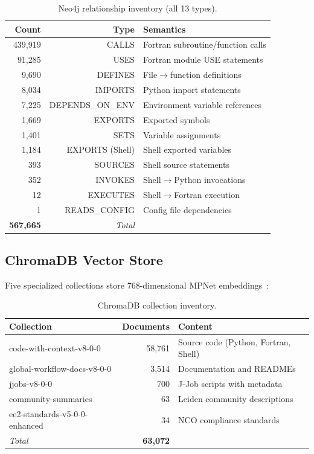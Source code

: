 \documentclass[11pt,letterpaper]{article}
\begin{document}
\begin{table}[H]
\centering
\caption{Neo4j relationship inventory (all 13 types).}
\label{tab:rels}
\begin{tabular}{@{}rrl@{}}
\toprule
\textbf{Count} & \textbf{Type} & \textbf{Semantics} \\
\midrule
439,919 & CALLS         & Fortran subroutine/function calls \\
91,285  & USES          & Fortran module USE statements \\
9,690   & DEFINES       & File$\to$function definitions \\
8,034   & IMPORTS       & Python import statements \\
7,225   & DEPENDS\_ON\_ENV & Environment variable references \\
1,669   & EXPORTS       & Exported symbols \\
1,401   & SETS          & Variable assignments \\
1,184   & EXPORTS (Shell) & Shell exported variables \\
393     & SOURCES       & Shell source statements \\
352     & INVOKES       & Shell$\to$Python invocations \\
12      & EXECUTES      & Shell$\to$Fortran execution \\
1       & READS\_CONFIG & Config file dependencies \\
\midrule
\textbf{567,665} & \textit{Total} & \\
\bottomrule
\end{tabular}
\end{table}

\subsection{ChromaDB Vector Store}

Five specialized collections store 768-dimensional MPNet
embeddings~\cite{song2020mpnet,reimers2019sbert}:

\begin{table}[H]
\centering
\caption{ChromaDB collection inventory.}
\label{tab:collections}
\begin{tabular}{@{}lrl@{}}
\toprule
\textbf{Collection} & \textbf{Documents} & \textbf{Content} \\
\midrule
code-with-context-v8-0-0     & 58,761 & Source code (Python, Fortran, Shell) \\
global-workflow-docs-v8-0-0  & 3,514  & Documentation and READMEs \\
jjobs-v8-0-0                 & 700    & J-Job scripts with metadata \\
community-summaries          & 63     & Leiden community descriptions \\
ee2-standards-v5-0-0-enhanced & 34    & NCO compliance standards \\
\midrule
\textit{Total}               & \textbf{63,072} & \\
\bottomrule
\end{tabular}
\end{table}
\end{document}
